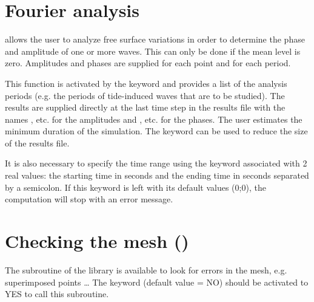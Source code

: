 \section{Fourier analysis}

 allows the user to analyze free surface variations
in order to determine the phase and amplitude of one or more waves.
This can only be done if the mean level is zero.
Amplitudes and phases are supplied for each point and for each period.

This function is activated by the keyword  and
provides a list of the analysis periods (e.g. the periods of tide-induced waves
that are to be studied).
The results are supplied directly at the last time step in the results file with
the names ,  etc. for the amplitudes
and ,  etc. for the phases.
The user estimates the minimum duration of the simulation.
The keyword 
can be used to reduce the size of the results file.

It is also necessary to specify the time range using the keyword
 associated with 2 real values:
the starting time in seconds and the ending time in seconds separated by a
semicolon.
If this keyword is left with its default values (0;0),
the computation will stop with an error message.

\section{Checking the mesh ()}

The subroutine  of the \bief library is available to look for
errors in the mesh, e.g. superimposed points \ldots
The keyword  (default value = NO) should be activated
to YES to call this subroutine.
